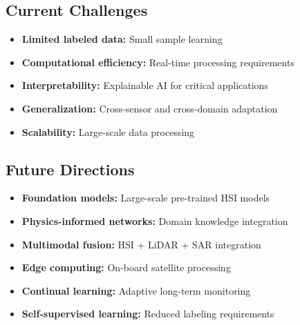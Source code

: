 \documentclass[12pt,a4paper]{article}
\begin{document}
\subsection{Current Challenges}

\begin{itemize}
\item \textbf{Limited labeled data:} Small sample learning
\item \textbf{Computational efficiency:} Real-time processing requirements
\item \textbf{Interpretability:} Explainable AI for critical applications
\item \textbf{Generalization:} Cross-sensor and cross-domain adaptation
\item \textbf{Scalability:} Large-scale data processing
\end{itemize}

\subsection{Future Directions}

\begin{itemize}
\item \textbf{Foundation models:} Large-scale pre-trained HSI models
\item \textbf{Physics-informed networks:} Domain knowledge integration
\item \textbf{Multimodal fusion:} HSI + LiDAR + SAR integration
\item \textbf{Edge computing:} On-board satellite processing
\item \textbf{Continual learning:} Adaptive long-term monitoring
\item \textbf{Self-supervised learning:} Reduced labeling requirements
\end{itemize}



\end{document}
